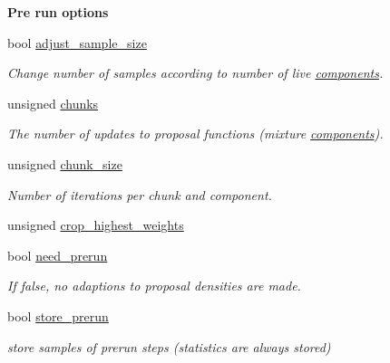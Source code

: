 \begin{Indent}{\bf Pre run options}\par
{\em \label{_amgrp8c2f6257f55ff385e844eafbe41ba090}
 }\begin{DoxyCompactItemize}
\item 
bool \hyperlink{structeos_1_1PopulationMonteCarloSampler_1_1Config_af4b575d8f24b51783b11bd5dca5ea576}{adjust\_\-sample\_\-size}
\begin{DoxyCompactList}\small\item\em Change number of samples according to number of live \hyperlink{namespaceeos_1_1components}{components}. \item\end{DoxyCompactList}\item 
unsigned \hyperlink{structeos_1_1PopulationMonteCarloSampler_1_1Config_a14c4bdc8c63ca8115e326e4c7bb3116e}{chunks}
\begin{DoxyCompactList}\small\item\em The number of updates to proposal functions (mixture \hyperlink{namespaceeos_1_1components}{components}). \item\end{DoxyCompactList}\item 
unsigned \hyperlink{structeos_1_1PopulationMonteCarloSampler_1_1Config_ac6d3a2f26905ec51f3e9eadf73d51792}{chunk\_\-size}
\begin{DoxyCompactList}\small\item\em Number of iterations per chunk and component. \item\end{DoxyCompactList}\item 
unsigned \hyperlink{structeos_1_1PopulationMonteCarloSampler_1_1Config_a394bc4c560e738d420fa34014745a7b7}{crop\_\-highest\_\-weights}
\item 
bool \hyperlink{structeos_1_1PopulationMonteCarloSampler_1_1Config_ac729d374ca2a58aeba6cf60d296d7720}{need\_\-prerun}
\begin{DoxyCompactList}\small\item\em If false, no adaptions to proposal densities are made. \item\end{DoxyCompactList}\item 
bool \hyperlink{structeos_1_1PopulationMonteCarloSampler_1_1Config_a85cf9361f3660df01fa551d9ebd62040}{store\_\-prerun}
\begin{DoxyCompactList}\small\item\em store samples of prerun steps (statistics are always stored) \item\end{DoxyCompactList}\end{DoxyCompactItemize}
\end{Indent}
